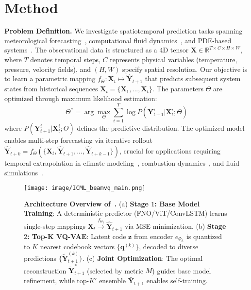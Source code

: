 \section{Method}
\textbf{Problem Definition.} We investigate spatiotemporal prediction tasks spanning meteorological forecasting~\cite{bi2023accurate}, computational fluid dynamics~\cite{wu2024prometheus}, and PDE-based systems~\cite{wu2024neural}. The observational data is structured as a 4D tensor $\mathbf{X} \in \mathbb{R}^{T \times C \times H \times W}$, where $T$ denotes temporal steps, $C$ represents physical variables (temperature, pressure, velocity fields), and $(H,W)$ specify spatial resolution. Our objective is to learn a parametric mapping $f_\Theta: \mathbf{X}_t \mapsto \hat{\mathbf{Y}}_{t+1}$ that predicts subsequent system states from historical sequences $\mathbf{X}_t = \{\mathbf{X}_1, ..., \mathbf{X}_t\}$. The parameters $\Theta$ are optimized through maximum likelihood estimation:
\begin{equation}
\Theta^* = \arg\max_{\Theta} \sum_{i=1}^T \log P(\mathbf{Y}_{t+1}^i | \mathbf{X}_t^i; \Theta)
\end{equation}
where $P(\mathbf{Y}_{t+1}^i | \mathbf{X}_t^i; \Theta)$ defines the predictive distribution. The optimized model enables multi-step forecasting via iterative rollout $\hat{\mathbf{Y}}_{t+k} = f_\Theta(\{\mathbf{X}_t, \hat{\mathbf{Y}}_{t+1}, ..., \hat{\mathbf{Y}}_{t+k-1}\})$, crucial for applications requiring temporal extrapolation in climate modeling~\cite{bi2023accurate}, combustion dynamics~\cite{anonymous2024openck}, and fluid simulations~\cite{wupure}.

\begin{figure*}[t]
\centering
\texttt{[image: image/ICML\_beamvq\_main.png]}
\caption{\textbf{Architecture Overview of~\method{}.}  
(a) \textbf{Stage $1$: Base Model Training}: A deterministic predictor (FNO/ViT/ConvLSTM) learns single-step mappings $\mathbf{X}_t \xrightarrow{f_{\Theta_f}} \hat{\mathbf{Y}}_{t+1}$ via MSE minimization.  
(b) \textbf{Stage $2$: Top-K VQ-VAE}: Latent code $\mathbf{z}$ from encoder $e_{\Phi_h}$ is quantized to $K$ nearest codebook vectors $\{\mathbf{q}^{(k)}\}$, decoded to diverse predictions $\{\tilde{\mathbf{Y}}_{t+1}^{(k)}\}$.  
(c) \textbf{Joint Optimization}: The optimal reconstruction $\tilde{\mathbf{Y}}_{t+1}^*$ (selected by metric $M$) guides base model refinement, while top-$K'$ ensemble $\bar{\mathbf{Y}}_{t+1}$ enables self-training.} 
\label{fig:Idea_main} 
\end{figure*}

